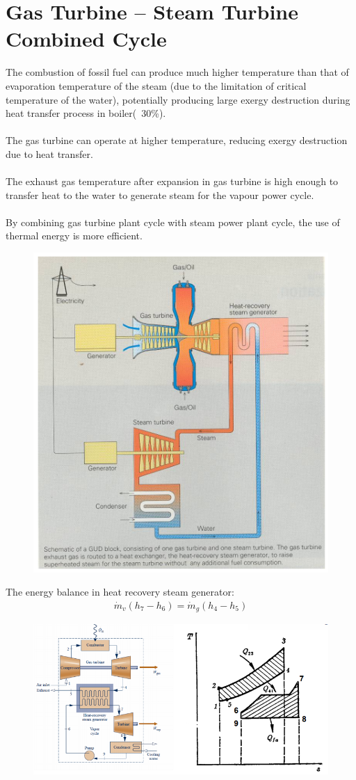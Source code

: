 \documentclass[class=report, crop=false, 12pt,a4paper]{standalone}
\numberwithin{equation}{section}
\begin{document}
\section{Gas Turbine – Steam Turbine Combined Cycle}
The combustion of fossil fuel can produce much higher temperature than that of evaporation temperature of the steam (due to the limitation of critical temperature of the water), potentially producing large exergy destruction during heat transfer process in boiler(~30\%). \\\\
The gas turbine can operate at higher temperature, reducing exergy destruction due to heat transfer. \\\\
The exhaust gas temperature after expansion in gas turbine is high enough to transfer heat to the water to generate steam for the vapour power cycle. \\\\
By combining gas turbine plant cycle with steam power plant cycle, the use of thermal energy is more efficient. 
\begin{figure}[H]
  \centering
  \includegraphics[width = 0.7 \textwidth]{../img/diagram173.png}
  \caption{}
\end{figure}
The energy balance in heat recovery steam generator: 
\begin{gather}
  \dot{m}_v(h_7-h_6) = \dot{m}_g(h_4-h_5)
\end{gather}
\begin{figure}[H]
  \centering
  \includegraphics[width = 1 \textwidth]{../img/diagram174.png}
  \caption{}
\end{figure}
\end{document}
